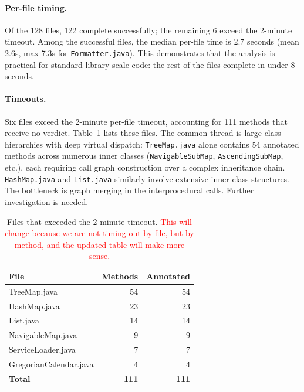 \paragraph{Per-file timing.}
Of the 128 files, 122 complete successfully; the remaining 6 exceed the 2-minute timeout.
Among the successful files, the median per-file time is 2.7 seconds (mean 2.6s, max 7.3s for \texttt{Formatter.java}).
This demonstrates that the analysis is practical for standard-library-scale code: the rest of the files complete in under 8 seconds.

\paragraph{Timeouts.}
Six files exceed the 2-minute per-file timeout, accounting for 111 methods that receive no verdict.
Table~\ref{tab:timeouts} lists these files.
The common thread is large class hierarchies with deep virtual dispatch: \texttt{TreeMap.java} alone contains 54 annotated methods across numerous inner classes (\texttt{NavigableSubMap}, \texttt{AscendingSubMap}, etc.), each requiring call graph construction over a complex inheritance chain.
\texttt{HashMap.java} and \texttt{List.java} similarly involve extensive inner-class structures.
The bottleneck is graph merging in the interprocedural calls. Further investigation is needed. 

\begin{table}[h]
\centering
\caption{Files that exceeded the 2-minute timeout. \textcolor{red}{This will change because we are not timing out by file, but by method, and the updated table will make more sense.}}
\label{tab:timeouts}
\begin{tabular}{lrr}
\toprule
\textbf{File} & \textbf{Methods} & \textbf{Annotated} \\
\midrule
TreeMap.java            & 54 & 54 \\
HashMap.java            & 23 & 23 \\
List.java               & 14 & 14 \\
NavigableMap.java       &  9 &  9 \\
ServiceLoader.java      &  7 &  7 \\
GregorianCalendar.java  &  4 &  4 \\
\midrule
\textbf{Total}          & \textbf{111} & \textbf{111} \\
\bottomrule
\end{tabular}
\end{table}

